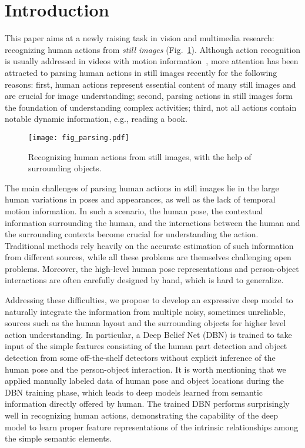 \documentclass{article}
\begin{document}
\section{Introduction}
\label{sec:intro}




This paper aims at a newly raising task in vision and multimedia research: recognizing human actions from \textit{still images} (Fig.~\ref{fig:parsing}).   Although action recognition is usually addressed in videos with motion information~\cite{Liang13,LinEvent}, more attention has been attracted to parsing human actions in still images recently for the following reasons: first, human actions represent essential content of many still images and are crucial for image understanding;  second, parsing actions in still images form the foundation of understanding complex activities;  third, not all actions contain notable dynamic information, e.g., reading a book.

\begin{figure}[!htpb]
\centering
\texttt{[image: fig\_parsing.pdf]}
\vspace{-8mm}
\caption{Recognizing human actions from still images, with the help of surrounding objects.}
\label{fig:parsing}
\end{figure}

The main challenges of parsing human actions in still images lie in the large human variations in poses and appearances, as well as the lack of temporal motion information.  In such a scenario, the human pose, the contextual information surrounding the human, and the interactions between the human and the surrounding contexts become crucial for understanding the action.  Traditional methods rely heavily on the accurate estimation of such information from different sources, while all these problems are themselves challenging open problems.  Moreover, the high-level human pose representations and person-object interactions are often carefully designed by hand, which is hard to generalize.

Addressing these difficulties, we propose to develop an expressive deep model to naturally integrate the information from multiple noisy, sometimes unreliable, sources such as the human layout and the surrounding objects for higher level action understanding.  In particular, a Deep Belief Net (DBN) is trained to take input of the simple features consisting of the human part detection and object detection from some off-the-shelf detectors without explicit inference of the human pose and the person-object interaction. It is worth mentioning that we applied manually labeled data of human pose and object locations during the DBN training phase, which leads to deep models learned from semantic information directly offered by human.  The trained DBN performs surprisingly well in recognizing human actions, demonstrating the capability of the deep model to learn proper feature representations of the intrinsic relationships among the simple semantic elements. 
\end{document}
